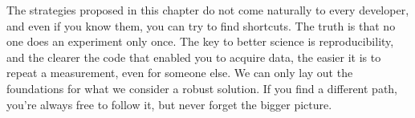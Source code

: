 The strategies proposed in this chapter do not come naturally to every developer, and even if you know them, you can try to find shortcuts. The truth is that no one does an experiment only once. The key to better science is reproducibility, and the clearer the code that enabled you to acquire data, the easier it is to repeat a measurement, even for someone else. We can only lay out the foundations for what we consider a robust solution. If you find a different path, you're always free to follow it, but never forget the bigger picture.
